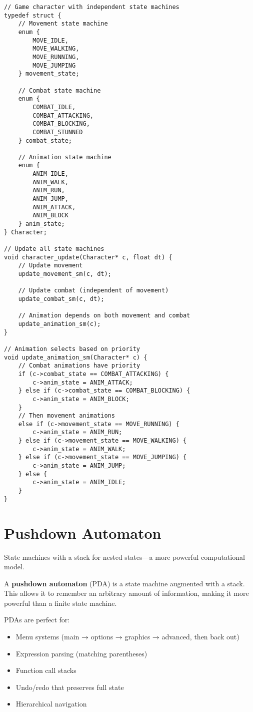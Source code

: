 \begin{lstlisting}
// Game character with independent state machines
typedef struct {
    // Movement state machine
    enum {
        MOVE_IDLE,
        MOVE_WALKING,
        MOVE_RUNNING,
        MOVE_JUMPING
    } movement_state;

    // Combat state machine
    enum {
        COMBAT_IDLE,
        COMBAT_ATTACKING,
        COMBAT_BLOCKING,
        COMBAT_STUNNED
    } combat_state;

    // Animation state machine
    enum {
        ANIM_IDLE,
        ANIM_WALK,
        ANIM_RUN,
        ANIM_JUMP,
        ANIM_ATTACK,
        ANIM_BLOCK
    } anim_state;
} Character;

// Update all state machines
void character_update(Character* c, float dt) {
    // Update movement
    update_movement_sm(c, dt);

    // Update combat (independent of movement)
    update_combat_sm(c, dt);

    // Animation depends on both movement and combat
    update_animation_sm(c);
}

// Animation selects based on priority
void update_animation_sm(Character* c) {
    // Combat animations have priority
    if (c->combat_state == COMBAT_ATTACKING) {
        c->anim_state = ANIM_ATTACK;
    } else if (c->combat_state == COMBAT_BLOCKING) {
        c->anim_state = ANIM_BLOCK;
    }
    // Then movement animations
    else if (c->movement_state == MOVE_RUNNING) {
        c->anim_state = ANIM_RUN;
    } else if (c->movement_state == MOVE_WALKING) {
        c->anim_state = ANIM_WALK;
    } else if (c->movement_state == MOVE_JUMPING) {
        c->anim_state = ANIM_JUMP;
    } else {
        c->anim_state = ANIM_IDLE;
    }
}
\end{lstlisting}

\section{Pushdown Automaton}

State machines with a stack for nested states—a more powerful computational model.

A \textbf{pushdown automaton} (PDA) is a state machine augmented with a stack. This allows it to remember an arbitrary amount of information, making it more powerful than a finite state machine.

PDAs are perfect for:
\begin{itemize}
    \item Menu systems (main → options → graphics → advanced, then back out)
    \item Expression parsing (matching parentheses)
    \item Function call stacks
    \item Undo/redo that preserves full state
    \item Hierarchical navigation
\end{itemize}

